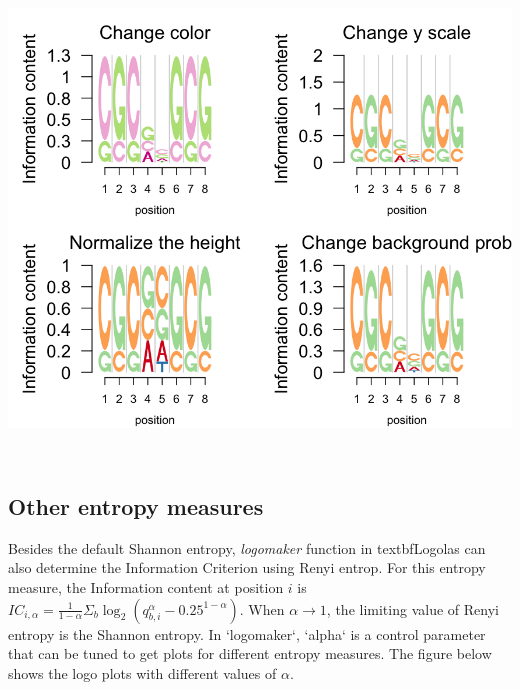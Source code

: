 \documentclass[12pt]{article}\usepackage[]{graphicx}\usepackage[usenames,dvipsnames]{color}
\newenvironment{knitrout}{}{} %
\begin{document}
\begin{knitrout}
\includegraphics[width=6in,height=5in]{figure/diff_features-1} 

\end{knitrout}


\subsection{Other entropy measures}

Besides the default Shannon entropy, \textit{logomaker} function in
textbf{Logolas} can also determine the Information Criterion using Renyi entrop. For this entropy measure, the Information content at position $i$ is $IC_{i,\alpha}=\frac{1}{1-\alpha}\Sigma_b\log_2(q_{b,i}^\alpha-0.25^{1-\alpha})$. When $\alpha\rightarrow1$, the limiting value of Renyi entropy is the Shannon entropy. In `logomaker`, `alpha` is a control parameter that can be tuned to get plots for different entropy measures. The figure below shows the logo plots with different values of $\alpha$.
\end{document}
